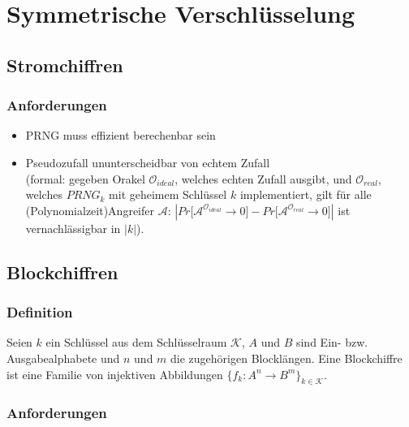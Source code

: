 \documentclass[a4paper,twoside,DIV15,BCOR12mm]{scrbook}
\begin{document}
	
\chapter{Symmetrische Verschlüsselung}


\section{Stromchiffren}


\subsection{Anforderungen}
	\begin{itemize}
		\item PRNG muss effizient berechenbar sein
		\item Pseudozufall ununterscheidbar von echtem Zufall\\ (formal: gegeben Orakel $\mathcal{O}_{ideal}$, welches echten Zufall ausgibt, und $\mathcal{O}_{real}$, welches ${PRNG}_k$ mit geheimem Schlüssel $k$ implementiert, gilt für alle (Polynomialzeit)Angreifer $\mathcal{A}$: $\left| Pr\lbrack \mathcal{A}^{\mathcal{O}_{ideal}} \rightarrow 0 \rbrack - Pr\lbrack \mathcal{A}^{\mathcal{O}_{real}} \rightarrow 0 \rbrack \right|$ ist vernachlässigbar in $\left| k \right|$).
	\end{itemize}
	
\section{Blockchiffren}

\subsection{Definition}

Seien $k$ ein Schlüssel aus dem Schlüsselraum $\mathcal{K}$, $A$ und $B$ sind Ein- bzw. Ausgabealphabete und $n$ und $m$ die zugehörigen Blocklängen. Eine Blockchiffre ist eine Familie von injektiven Abbildungen $\{ f_k \colon A^n \rightarrow B^m \}_{k \in \mathcal{K}}$. \\


\subsection{Anforderungen}
\end{document}
